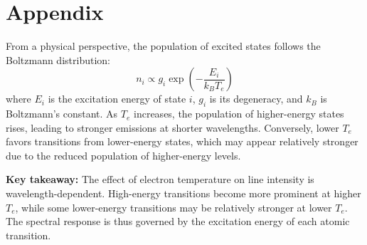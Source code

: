 \documentclass[12pt,a4paper]{article}
\begin{document}
	\section{Appendix}
	From a physical perspective, the population of excited states follows the Boltzmann distribution:
	\[
	n_i \propto g_i \exp\left(-\frac{E_i}{k_B T_e}\right)
	\]
	where $E_i$ is the excitation energy of state $i$, $g_i$ is its degeneracy, and $k_B$ is Boltzmann’s constant. As $T_e$ increases, the population of higher-energy states rises, leading to stronger emissions at shorter wavelengths. Conversely, lower $T_e$ favors transitions from lower-energy states, which may appear relatively stronger due to the reduced population of higher-energy levels.
	
	\textbf{Key takeaway:} The effect of electron temperature on line intensity is wavelength-dependent. High-energy transitions become more prominent at higher $T_e$, while some lower-energy transitions may be relatively stronger at lower $T_e$. The spectral response is thus governed by the excitation energy of each atomic transition.
	
	\newpage
	
	

	
\end{document}
